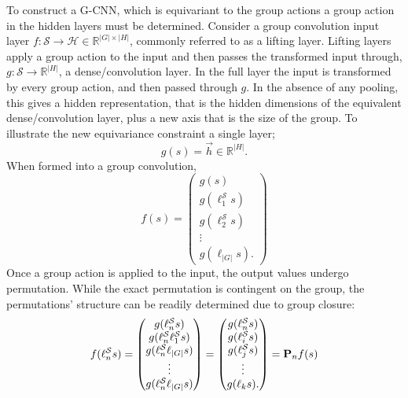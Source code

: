 To construct a G-CNN, which is equivariant to the group actions a group action in the hidden layers must be determined. Consider a group convolution input layer $f : \mathcal{S} \rightarrow \mathcal{H} \in \mathbb{R}^{|G| \times |H|}$, commonly referred to as a lifting layer. Lifting layers apply a group action to the input and then passes the transformed input through, $ g: \mathcal{S} \rightarrow \mathbb{R}^{|H|}$, a dense/convolution layer. In the full layer the input is transformed by every group action, and then passed through $g$. In the absence of any pooling, this gives a hidden representation, that is the hidden dimensions of the equivalent dense/convolution layer, plus a new axis that is the size of the group. To illustrate the new equivariance constraint a single layer;
\begin{equation}
	g(s) = \vec{h} \in \mathbb{R}^{|H|}.
\end{equation}
When formed into a group convolution,
\begin{equation}
	f(s) = \begin{pmatrix}
		g(s)                   \\
		g(\ell_1^\mathcal{S}s) \\
		g(\ell^\mathcal{S}_2s) \\
		\vdots                 \\
		g(\ell_{|G|}s).
	\end{pmatrix}
\end{equation}
Once a group action is applied to the input, the output values undergo permutation. While the exact permutation is contingent on the group, the permutations' structure can be readily determined due to group closure:
\begin{equation}\label{eq:gs_perm}
	f(\ell_n^\mathcal{S}s) = \begin{pmatrix}
		g(\ell_n^\mathcal{S}s)                   \\
		g(\ell_n^\mathcal{S}\ell_1^\mathcal{S}s) \\
		g(\ell_n^\mathcal{S}\ell_{|G|}s)         \\
		\vdots                                   \\
		g(\ell_n^\mathcal{S}\ell_{|G|}s)         \\
	\end{pmatrix}
	= \begin{pmatrix}
		g(\ell_n^\mathcal{S}s) \\
		g(\ell_i^\mathcal{S}s) \\
		g(\ell^\mathcal{S}_js) \\
		\vdots                 \\
		g(\ell_{k}s).
	\end{pmatrix}
	= \mathbf{P}_n f(s)
\end{equation}
